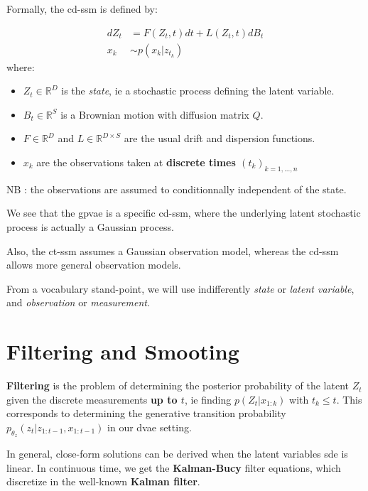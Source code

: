 Formally, the \gls{cd-ssm} is defined by:

\begin{tcolorbox}[colback=blue!5!white,colframe=black!75!black,title=Continuous-Discrete State Space model]
    \begin{align}
        dZ_t &= F(Z_t, t)dt + L(Z_t,t) dB_t \\
        x_k &\sim p(x_k \vert z_{t_k})
    \end{align}
    where:
    \begin{itemize}
        \item $Z_t \in \mathbb{R}^{D}$ is the \textit{state}, ie a stochastic process defining the latent variable.
        \item $B_t \in \mathbb{R}^{S}$ is a Brownian motion with diffusion matrix $Q$.
        \item $F \in \mathbb{R}^{D}$ and $L \in \mathbb{R}^{D \times S}$ are the usual drift and dispersion functions.
        \item $x_k$ are the observations taken at \textbf{discrete times $(t_k)_{k=1,...,n}$}
    \end{itemize}
    NB : the observations are assumed to conditionnally independent of the state.
\end{tcolorbox}

We see that the \gls{gpvae} is a specific \gls{cd-ssm}, where the underlying latent stochastic process 
is actually a Gaussian process.

Also, the \gls{ct-ssm} assumes a Gaussian observation model, whereas the \gls{cd-ssm} allows more general 
observation models.

From a vocabulary stand-point, we will use indifferently \textit{state} or \textit{latent variable}, and 
\textit{observation} or \textit{measurement}.

\section{Filtering and Smooting}

\textbf{Filtering} is the problem of determining the posterior probability of the latent $Z_t$ given the 
discrete measurements \textbf{up to $t$}, ie finding $p(Z_t \vert x_{1:k})$ with $t_k \leq t$. This corresponds to 
determining the generative transition probability $p_{\theta_z}(z_t \vert z_{1:t-1}, x_{1:t-1})$ in our 
\gls{dvae} setting.

In general, close-form solutions can be derived when the latent variables \gls{sde} is linear. In continuous 
time, we get the \textbf{Kalman-Bucy} filter equations, which discretize in the well-known \textbf{Kalman filter}.

